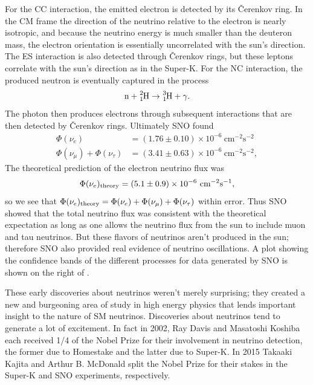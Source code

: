 For the CC interaction, the
emitted electron is detected by its \v{C}erenkov ring. In the CM frame
the direction of the neutrino relative to the electron is nearly isotropic, and
because the neutrino energy is much smaller than the deuteron mass, the
electron orientation is essentially uncorrelated with the sun's direction.
The ES interaction is also detected through \v{C}erenkov rings, but these
leptons correlate with the sun's direction as in the Super-K. For the NC
interaction, the produced neutron is eventually captured in the process
\begin{equation}
 \text{n}+\ce{^2_1H}\to\ce{^3_1H}+\gamma.
\end{equation}
The photon then produces electrons through subsequent interactions that are
then detected by \v{C}erenkov rings. Ultimately SNO found
\begin{equation}
  \begin{aligned}
    \Phi(\nu_e)&=(1.76\pm0.10)\times10^{-6}~\text{cm}^{-2}\text{s}^{-2} \\
    \Phi(\nu_\mu)+\Phi(\nu_\tau)
               &=(3.41\pm0.63)\times10^{-6}~\text{cm}^{-2}\text{s}^{-2},
  \end{aligned}
\end{equation}
The theoretical prediction of the electron neutrino flux was
\begin{equation}
  \Phi(\nu_e)_{\rm theory}
    =(5.1\pm0.9)\times10^{-6}~\text{cm}^{-2}\text{s}^{-1}, 
\end{equation}
so we see that 
$\Phi(\nu_e)_{\rm theory}=\Phi(\nu_e)+\Phi(\nu_\mu)+\Phi(\nu_\tau)$
within error. Thus SNO showed that the total
neutrino flux was consistent with the theoretical expectation as long as
one allows the neutrino flux from the sun to include muon and tau neutrinos.
But these flavors of neutrinos aren't produced in the sun; therefore SNO also
provided real evidence of neutrino oscillations.
A plot showing the confidence bands of the different processes for data
generated by SNO is shown on the right of .

These early discoveries about neutrinos weren't merely surprising; they
created a new and burgeoning area of study in high energy physics
that lends important
insight to the nature of SM neutrinos. Discoveries about neutrinos tend
to generate a lot of excitement.
In fact in 2002, Ray Davis and Masatoshi Koshiba each received 1/4 of
the Nobel Prize for their involvement in neutrino detection, the former
due to Homestake and the latter due to Super-K. In 2015 
Takaaki Kajita and Arthur B. McDonald split the Nobel Prize for their
stakes in the Super-K and SNO experiments, respectively.

